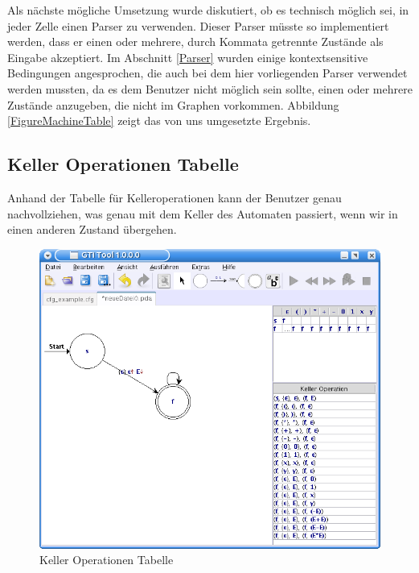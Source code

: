 Als nächste mögliche Umsetzung wurde diskutiert, ob es technisch möglich sei,
in jeder Zelle einen Parser zu verwenden. Dieser Parser müsste so implementiert
werden, dass er einen oder mehrere, durch Kommata getrennte Zustände als Eingabe
akzeptiert. Im Abschnitt \ref{Parser} wurden einige kontextsensitive Bedingungen
angesprochen, die auch bei dem hier vorliegenden Parser verwendet werden
mussten, da es dem Benutzer nicht möglich sein sollte, einen oder mehrere
Zustände anzugeben, die nicht im Graphen vorkommen. Abbildung
\ref{FigureMachineTable} zeigt das von uns umgesetzte Ergebnis.\vspace{10pt}


\subsection{Keller Operationen Tabelle}\label{TablesPDA}

Anhand der Tabelle für Kelleroperationen kann der Benutzer genau
nachvollziehen, was genau mit dem Keller des Automaten passiert, wenn wir
in einen anderen Zustand übergehen.\vspace{10pt}

\begin{figure}[h!]
\begin{center}
\includegraphics[width=12cm]{../images/stack_operation_table.png}
\caption{Keller Operationen Tabelle}
\label{FigureStackOperationTable}
\end{center}
\end{figure}
\vspace{10pt}

